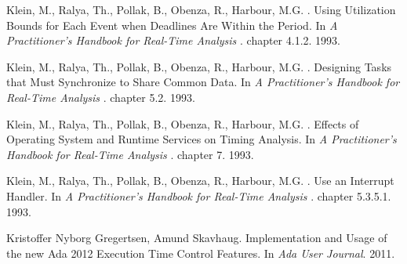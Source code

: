 \documentclass{article}
\begin{document}
\begin{thebibliography}{1}
Klein, M., Ralya, Th., Pollak, B., Obenza, R., Harbour, M.G. .
\newblock Using Utilization Bounds for Each Event when Deadlines Are Within the Period.
\newblock In {\em A Practitioner’s Handbook for Real-Time Analysis
}. chapter 4.1.2. 1993.

Klein, M., Ralya, Th., Pollak, B., Obenza, R., Harbour, M.G. .
\newblock Designing Tasks that Must Synchronize to Share Common Data.
\newblock In {\em A Practitioner’s Handbook for Real-Time Analysis
}. chapter 5.2. 1993.

Klein, M., Ralya, Th., Pollak, B., Obenza, R., Harbour, M.G. .
\newblock Effects of Operating System and Runtime Services on Timing Analysis.
\newblock In {\em A Practitioner’s Handbook for Real-Time Analysis
}. chapter 7. 1993.

Klein, M., Ralya, Th., Pollak, B., Obenza, R., Harbour, M.G. .
\newblock Use an Interrupt Handler.
\newblock In {\em A Practitioner’s Handbook for Real-Time Analysis
}. chapter 5.3.5.1. 1993.

Kristoffer Nyborg Gregertsen, Amund Skavhaug.
\newblock Implementation and Usage of the new Ada 2012 Execution Time Control Features.
\newblock In {\em Ada User Journal}. 2011.

\end{thebibliography}
\end{document}
